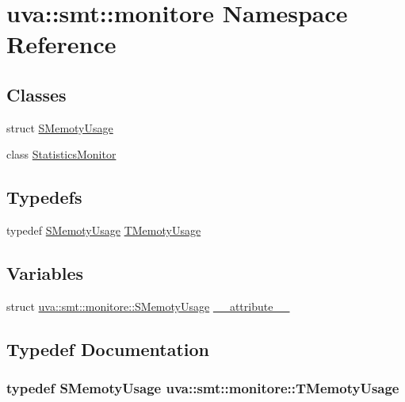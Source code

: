 \hypertarget{namespaceuva_1_1smt_1_1monitore}{}\section{uva\+:\+:smt\+:\+:monitore Namespace Reference}
\label{namespaceuva_1_1smt_1_1monitore}
\subsection*{Classes}
\begin{DoxyCompactItemize}
\item 
struct \hyperlink{structuva_1_1smt_1_1monitore_1_1_s_memoty_usage}{S\+Memoty\+Usage}
\item 
class \hyperlink{classuva_1_1smt_1_1monitore_1_1_statistics_monitor}{Statistics\+Monitor}
\end{DoxyCompactItemize}
\subsection*{Typedefs}
\begin{DoxyCompactItemize}
\item 
typedef \hyperlink{structuva_1_1smt_1_1monitore_1_1_s_memoty_usage}{S\+Memoty\+Usage} \hyperlink{namespaceuva_1_1smt_1_1monitore_aaa66b205d3960a0507eaa35abcb56374}{T\+Memoty\+Usage}
\end{DoxyCompactItemize}
\subsection*{Variables}
\begin{DoxyCompactItemize}
\item 
struct \hyperlink{structuva_1_1smt_1_1monitore_1_1_s_memoty_usage}{uva\+::smt\+::monitore\+::\+S\+Memoty\+Usage} \hyperlink{namespaceuva_1_1smt_1_1monitore_a1c42133abb9426e1cbeb32c20fa03450}{\+\_\+\+\_\+attribute\+\_\+\+\_\+}
\end{DoxyCompactItemize}


\subsection{Typedef Documentation}
\hypertarget{namespaceuva_1_1smt_1_1monitore_aaa66b205d3960a0507eaa35abcb56374}{}
\subsubsection[{T\+Memoty\+Usage}]{\setlength{\rightskip}{0pt plus 5cm}typedef {\bf S\+Memoty\+Usage} {\bf uva\+::smt\+::monitore\+::\+T\+Memoty\+Usage}}\label{namespaceuva_1_1smt_1_1monitore_aaa66b205d3960a0507eaa35abcb56374}


